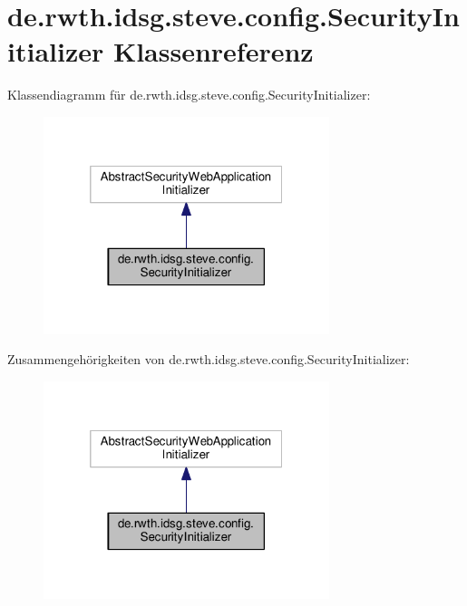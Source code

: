 \hypertarget{classde_1_1rwth_1_1idsg_1_1steve_1_1config_1_1_security_initializer}{\section{de.\-rwth.\-idsg.\-steve.\-config.\-Security\-Initializer Klassenreferenz}
\label{classde_1_1rwth_1_1idsg_1_1steve_1_1config_1_1_security_initializer}
}


Klassendiagramm für de.\-rwth.\-idsg.\-steve.\-config.\-Security\-Initializer\-:
\nopagebreak
\begin{figure}[H]
\begin{center}
\leavevmode
\includegraphics[width=236pt]{classde_1_1rwth_1_1idsg_1_1steve_1_1config_1_1_security_initializer__inherit__graph}
\end{center}
\end{figure}


Zusammengehörigkeiten von de.\-rwth.\-idsg.\-steve.\-config.\-Security\-Initializer\-:
\nopagebreak
\begin{figure}[H]
\begin{center}
\leavevmode
\includegraphics[width=236pt]{classde_1_1rwth_1_1idsg_1_1steve_1_1config_1_1_security_initializer__coll__graph}
\end{center}
\end{figure}


